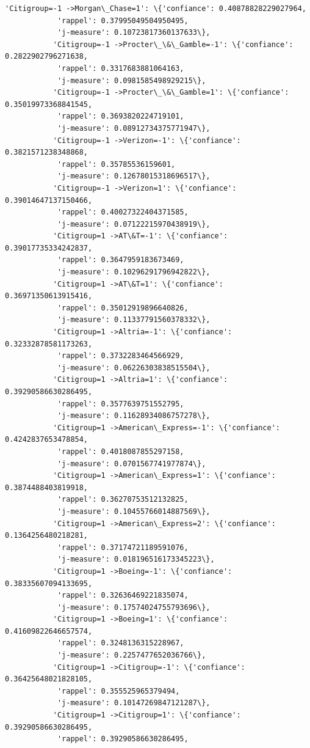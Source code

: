 \documentclass[11pt]{article}
\begin{document}
\begin{Verbatim}[commandchars=\\\{\}]
           'Citigroup=-1 ->Morgan\_Chase=1': \{'confiance': 0.40878828229027964,
            'rappel': 0.37995049504950495,
            'j-measure': 0.10723817360137633\},
           'Citigroup=-1 ->Procter\_\&\_Gamble=-1': \{'confiance': 0.2822902796271638,
            'rappel': 0.3317683881064163,
            'j-measure': 0.0981585498929215\},
           'Citigroup=-1 ->Procter\_\&\_Gamble=1': \{'confiance': 0.35019973368841545,
            'rappel': 0.3693820224719101,
            'j-measure': 0.08912734375771947\},
           'Citigroup=-1 ->Verizon=-1': \{'confiance': 0.3821571238348868,
            'rappel': 0.35785536159601,
            'j-measure': 0.12678015318696517\},
           'Citigroup=-1 ->Verizon=1': \{'confiance': 0.39014647137150466,
            'rappel': 0.40027322404371585,
            'j-measure': 0.07122215970438919\},
           'Citigroup=1 ->AT\&T=-1': \{'confiance': 0.39017735334242837,
            'rappel': 0.3647959183673469,
            'j-measure': 0.10296291796942822\},
           'Citigroup=1 ->AT\&T=1': \{'confiance': 0.36971350613915416,
            'rappel': 0.35012919896640826,
            'j-measure': 0.11337791560378332\},
           'Citigroup=1 ->Altria=-1': \{'confiance': 0.32332878581173263,
            'rappel': 0.3732283464566929,
            'j-measure': 0.06226303838515504\},
           'Citigroup=1 ->Altria=1': \{'confiance': 0.39290586630286495,
            'rappel': 0.3577639751552795,
            'j-measure': 0.11628934086757278\},
           'Citigroup=1 ->American\_Express=-1': \{'confiance': 0.4242837653478854,
            'rappel': 0.4018087855297158,
            'j-measure': 0.0701567741977874\},
           'Citigroup=1 ->American\_Express=1': \{'confiance': 0.3874488403819918,
            'rappel': 0.36270753512132825,
            'j-measure': 0.10455766014887569\},
           'Citigroup=1 ->American\_Express=2': \{'confiance': 0.1364256480218281,
            'rappel': 0.37174721189591076,
            'j-measure': 0.018196516173345223\},
           'Citigroup=1 ->Boeing=-1': \{'confiance': 0.38335607094133695,
            'rappel': 0.32636469221835074,
            'j-measure': 0.17574024755793696\},
           'Citigroup=1 ->Boeing=1': \{'confiance': 0.41609822646657574,
            'rappel': 0.3248136315228967,
            'j-measure': 0.2257477652036766\},
           'Citigroup=1 ->Citigroup=-1': \{'confiance': 0.36425648021828105,
            'rappel': 0.355525965379494,
            'j-measure': 0.10147269847121287\},
           'Citigroup=1 ->Citigroup=1': \{'confiance': 0.39290586630286495,
            'rappel': 0.39290586630286495,

\end{Verbatim}
\end{document}
